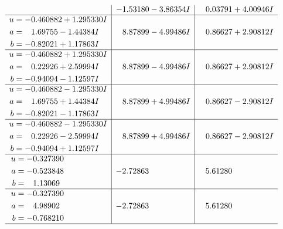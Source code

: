 \documentclass[1p]{elsarticle_modified}
\theoremstyle{definition}
\begin{document}
$$\begin{array}{c|c|c}
 & -1.53180 - 3.86354 I & \phantom{-}0.03791 + 4.00946 I \\ \hline\begin{aligned}
u &= -0.460882 + 1.295330 I \\
a &= \phantom{-}1.69755 - 1.44384 I \\
b &= -0.82021 + 1.17863 I\end{aligned}
 & \phantom{-}8.87899 - 4.99486 I & \phantom{-}0.86627 + 2.90812 I \\ \hline\begin{aligned}
u &= -0.460882 + 1.295330 I \\
a &= \phantom{-}0.22926 + 2.59994 I \\
b &= -0.94094 - 1.12597 I\end{aligned}
 & \phantom{-}8.87899 - 4.99486 I & \phantom{-}0.86627 + 2.90812 I \\ \hline\begin{aligned}
u &= -0.460882 - 1.295330 I \\
a &= \phantom{-}1.69755 + 1.44384 I \\
b &= -0.82021 - 1.17863 I\end{aligned}
 & \phantom{-}8.87899 + 4.99486 I & \phantom{-}0.86627 - 2.90812 I \\ \hline\begin{aligned}
u &= -0.460882 - 1.295330 I \\
a &= \phantom{-}0.22926 - 2.59994 I \\
b &= -0.94094 + 1.12597 I\end{aligned}
 & \phantom{-}8.87899 + 4.99486 I & \phantom{-}0.86627 - 2.90812 I \\ \hline\begin{aligned}
u &= -0.327390\phantom{ +0.000000I} \\
a &= -0.523848\phantom{ +0.000000I} \\
b &= \phantom{-}1.13069\phantom{ +0.000000I}\end{aligned}
 & -2.72863\phantom{ +0.000000I} & \phantom{-}5.61280\phantom{ +0.000000I} \\ \hline\begin{aligned}
u &= -0.327390\phantom{ +0.000000I} \\
a &= \phantom{-}4.98902\phantom{ +0.000000I} \\
b &= -0.768210\phantom{ +0.000000I}\end{aligned}
 & -2.72863\phantom{ +0.000000I} & \phantom{-}5.61280\phantom{ +0.000000I}\\
 \hline 
 \end{array}$$\newpage\newpage\renewcommand{\arraystretch}{1}
\end{document}
